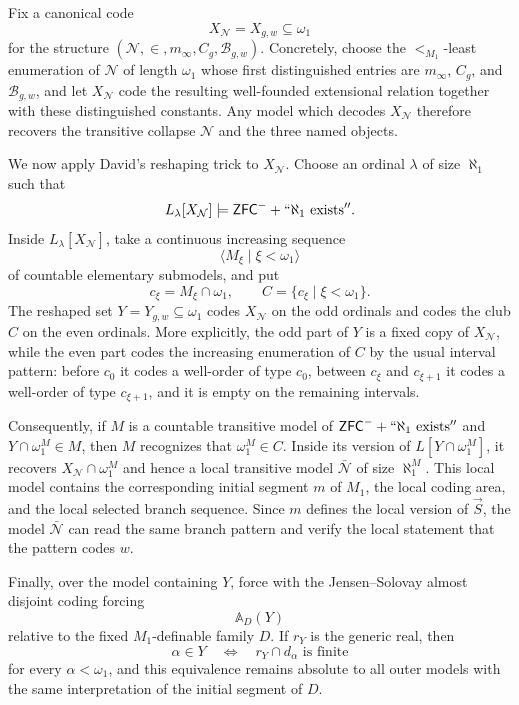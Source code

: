 \documentclass[a4paper,11pt]{article}
\newcommand{\ZFC}{\mathsf{ZFC}}
\begin{document}
Fix a canonical code
\[
   X_{\mathcal N}=X_{g,w}\subseteq\omega_1
\]
for the structure $(\mathcal N,\in,m_\infty,C_g,\mathcal B_{g,w})$.  Concretely, choose the $<_{M_1}$-least enumeration of $\mathcal N$ of length $\omega_1$ whose first distinguished entries are $m_\infty$, $C_g$, and $\mathcal B_{g,w}$, and let $X_{\mathcal N}$ code the resulting well-founded extensional relation together with these distinguished constants.  Any model which decodes $X_{\mathcal N}$ therefore recovers the transitive collapse $\mathcal N$ and the three named objects.

We now apply David's reshaping trick to $X_{\mathcal N}$.  Choose an ordinal $\lambda$ of size $\aleph_1$ such that
\[
   L_\lambda[X_{\mathcal N}]\models \ZFC^-+``\aleph_1\text{ exists}''.
\]
Inside $L_\lambda[X_{\mathcal N}]$, take a continuous increasing sequence
\[
   \langle M_\xi\mid \xi<\omega_1\rangle
\]
of countable elementary submodels, and put
\[
   c_\xi=M_\xi\cap\omega_1,
   \qquad
   C=\{c_\xi\mid\xi<\omega_1\}.
\]
The reshaped set $Y=Y_{g,w}\subseteq\omega_1$ codes $X_{\mathcal N}$ on the odd ordinals and codes the club $C$ on the even ordinals.  More explicitly, the odd part of $Y$ is a fixed copy of $X_{\mathcal N}$, while the even part codes the increasing enumeration of $C$ by the usual interval pattern: before $c_0$ it codes a well-order of type $c_0$, between $c_\xi$ and $c_{\xi+1}$ it codes a well-order of type $c_{\xi+1}$, and it is empty on the remaining intervals.

Consequently, if $M$ is a countable transitive model of $\ZFC^-+``\aleph_1\text{ exists}''$ and $Y\cap\omega_1^M\in M$, then $M$ recognizes that $\omega_1^M\in C$.  Inside its version of $L[Y\cap\omega_1^M]$, it recovers $X_{\mathcal N}\cap\omega_1^M$ and hence a local transitive model $\bar{\mathcal N}$ of size $\aleph_1^M$.  This local model contains the corresponding initial segment $m$ of $M_1$, the local coding area, and the local selected branch sequence.  Since $m$ defines the local version of $\vec S$, the model $\bar{\mathcal N}$ can read the same branch pattern and verify the local statement that the pattern codes $w$.

Finally, over the model containing $Y$, force with the Jensen--Solovay almost disjoint coding forcing
\[
   \mathbb A_D(Y)
\]
relative to the fixed $M_1$-definable family $D$.  If $r_Y$ is the generic real, then
\[
   \alpha\in Y
   \quad\Longleftrightarrow\quad
   r_Y\cap d_\alpha\text{ is finite}
\]
for every $\alpha<\omega_1$, and this equivalence remains absolute to all outer models with the same interpretation of the initial segment of $D$.
\end{document}
